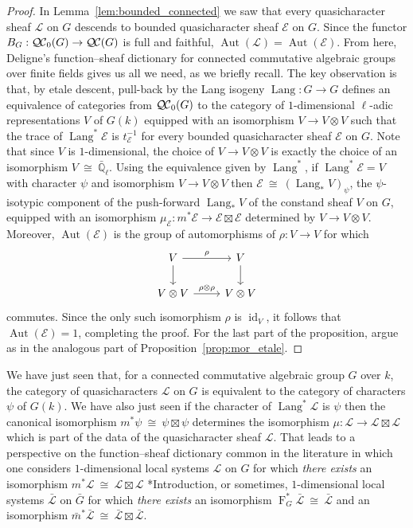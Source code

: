 \documentclass{amsart}
\theoremstyle{plain}
\theoremstyle{definition}
\theoremstyle{remark}
\newcommand{\EE}{\mathbb{\bar Q}_\ell}
\newcommand{\Fq}{k}
\newcommand{\Frob}[1]{\operatorname{F}_{#1}}
\DeclareMathOperator{\Aut}{Aut}
\DeclareMathOperator{\id}{id}
\DeclareMathOperator{\Lang}{Lang}
\newcommand{\iso}{{\ \cong\ }}
\newcommand{\qcs}[1]{{\mathcal{#1}}}
\newcommand{\gqcs}[1]{{\mathcal{\bar #1}}}
\newcommand{\QC}{{\mathcal{Q\hskip-0.8pt C}}}
\newcommand{\bQC}{{\QC_0}}
\newcommand{\trFrob}[1]{t_{#1}}
\newcommand{\bm}{\bar{m}}
\newcommand{\bG}{\bar{G}}
\begin{document}
\begin{proof}
In Lemma~\ref{lem:bounded_connected} we saw that every quasicharacter sheaf $\qcs{L}$ on $G$ descends to bounded quasicharacter sheaf $\qcs{E}$ on $G$. Since the functor $B_G : \bQC(G) \to \QC(G)$ is full and faithful, $\Aut(\qcs{L}) = \Aut(\qcs{E})$.
From here, Deligne's function--sheaf dictionary for connected commutative algebraic groups over finite fields   gives us all we need, as we briefly recall.
The key observation is that, by etale descent, pull-back by the Lang isogeny $\Lang : G\to G$ defines an equivalence of categories from $\bQC(G)$ to the category of $1$-dimensional $\ell$-adic representations $V$ of $G(\Fq)$ equipped with an isomorphism $V \to V\otimes V$ such that the trace of $\Lang^*\qcs{E}$ is $\trFrob{\qcs{E}}^{-1}$ for every bounded quasicharacter sheaf $\qcs{E}$ on $G$. 
Note that since $V$ is $1$-dimensional, the choice of $V \to V\otimes V$ is exactly the choice of an isomorphism $V\iso \EE$.
Using the equivalence given by $\Lang^*$, if $\Lang^*\qcs{E} = V$ with character $\psi$ and isomorphism $V\to V\otimes V$ then 
$\qcs{E} \iso (\Lang_* V)_\psi$, the $\psi$-isotypic component of the push-forward $\Lang_* V$ of the constand sheaf $V$ on $G$, equipped with an isomorphism $\mu_\qcs{E} : m^* \qcs{E} \to \qcs{E} \boxtimes\qcs{E}$ determined by $V\to V\otimes V$.
Moreover, $\Aut(\qcs{E})$ is the group of automorphisms of $\rho : V\to V$ for which 
\[
\begin{tikzcd}
\arrow{d}{} V \arrow{r}{\rho} & V\arrow{d}{}\\
V\otimes V \arrow{r}{\rho\otimes \rho} & V\otimes V
\end{tikzcd}
\]
commutes. 
Since the only such isomorphism $\rho$ is $\id_V$, it follows that $\Aut(\qcs{E}) = 1$, completing the proof.
For the last part of the proposition, argue as in the analogous part of Proposition~\ref{prop:mor_etale}.
\end{proof}


We have just seen that, for a connected commutative algebraic group $G$ over $\Fq$, the category of quasicharacters $\qcs{L}$ on $G$ is equivalent to the category of characters $\psi$ of $G(\Fq)$.
We have also just seen if the character of $\Lang^*\qcs{L}$ is $\psi$ then the canonical isomorphism $m^*\psi \iso \psi \boxtimes \psi$ determines the isomorphism $\mu : \qcs{L} \to \qcs{L}\boxtimes\qcs{L}$ which is part of the data of the quasicharacter sheaf $\qcs{L}$. That leads to a perspective on the function--sheaf dictionary common in the literature in which one considers $1$-dimensional local systems $\qcs{L}$ on $G$ for which \emph{there exists} an isomorphism $m^*\qcs{L} \iso \qcs{L} \boxtimes\qcs{L}$ \cite{kamgarpour:09a}*{Introduction}, or sometimes, $1$-dimensional local systems $\gqcs{L}$ on $\bG$ for which \emph{there exists} an isomorphism $\Frob{G}^*\gqcs{L} \iso \gqcs{L}$ and an isomorphism $\bm^*\gqcs{L} \iso \gqcs{L} \boxtimes\gqcs{L}$.
\end{document}
